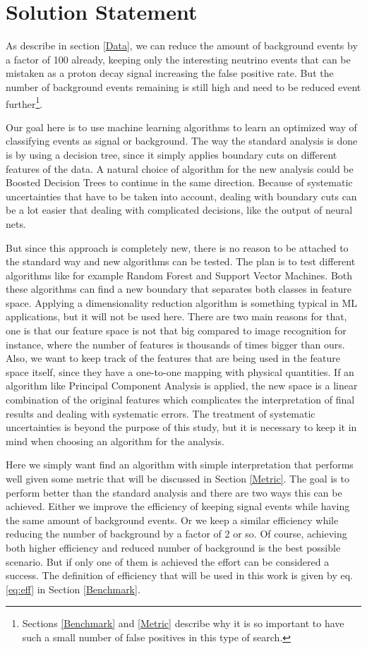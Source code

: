 
\section{Solution Statement}

As describe in section \ref{Data}, we can reduce the amount of background events by a factor of 100 already, keeping only the interesting neutrino events that can be mistaken as a proton decay signal increasing the false positive rate. But the number of background events remaining is still high and need to be reduced event further\footnote{Sections \ref{Benchmark} and \ref{Metric} describe why it is so important to have such a small number of false positives in this type of search.}.

Our goal here is to use machine learning algorithms to learn an optimized way of classifying events as signal or background. The way the standard analysis is done is by using a decision tree, since it simply applies boundary cuts on different features of the data. A natural choice of algorithm for the new analysis could be Boosted Decision Trees to continue in the same direction. Because of systematic uncertainties that have to be taken into account, dealing with boundary cuts can be a lot easier that dealing with complicated decisions, like the output of neural nets.

But since this approach is completely new, there is no reason to be attached to the standard way and new algorithms can be tested. The plan is to test different algorithms like for example Random Forest and Support Vector Machines. Both these algorithms can find a new boundary that separates both classes in feature space.
Applying a dimensionality reduction algorithm is something typical in ML applications, but it will not be used here. There are two main reasons for that, one is that our feature space is not that big compared to image recognition for instance, where the number of features is thousands of times bigger than ours. Also, we want to keep track of the features that are being used in the feature space itself, since they have a one-to-one mapping with physical quantities. If an algorithm like Principal Component Analysis is applied, the new space is a linear combination of the original features which complicates the interpretation of final results and dealing with systematic errors. The treatment of systematic uncertainties is beyond the purpose of this study, but it is necessary to keep it in mind when choosing an algorithm for the analysis.

Here we simply want find an algorithm with simple interpretation that performs well given some metric that will be discussed in Section \ref{Metric}. The goal is to perform better than the standard analysis and there are two ways this can be achieved. Either we improve the efficiency of keeping signal events while having the same amount of background events. Or we keep a similar efficiency while reducing the number of background by a factor of 2 or so. Of course, achieving both higher efficiency and reduced number of background is the best possible scenario. But if only one of them is achieved the effort can be considered a success. The definition of efficiency that will be used in this work is given by eq. \ref{eq:eff} in Section \ref{Benchmark}.
